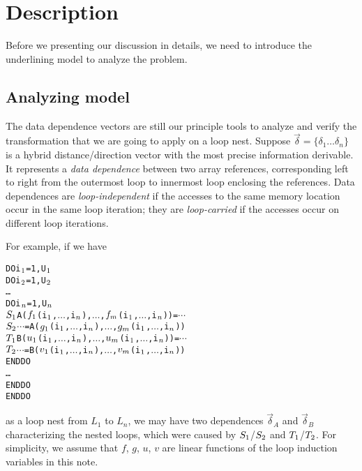 
\section{Description}
\label{description}

Before we presenting our discussion in details, we need to introduce
the underlining model to analyze the problem.

\subsection{Analyzing model}
\label{sec:model}

The data dependence vectors\cite{Ban88} are still our principle tools
to analyze and verify the transformation that we are going to apply on
a loop nest. Suppose $\vec{\delta} =\{\delta_{1}\dots\delta_{n}\}$
is a hybrid distance/direction vector with the most precise
information derivable. It represents a \emph{data dependence} between two
array references, corresponding left to right from the outermost loop
to innermost loop enclosing the references. Data dependences are
\emph{loop-independent} if the accesses to the same memory location
occur in the same loop iteration; they are \emph{loop-carried} if the
accesses occur on different loop iterations.

For example, if we have

{\small
\begin{alltt}
 DO i\(\sb{1}\) = 1, U\(\sb{1}\)
   DO i\(\sb{2}\) = 1, U\(\sb{2}\)
     \dots
     DO i\(\sb{n}\) = 1, U\(\sb{n}\)
\(S\sb{1}\)     A(\(f\sb{1}\)(i\(\sb{1}\),\(\dots\),i\(\sb{n}\)),\(\dots\),\(f\sb{m}\)(i\(\sb{1}\),\(\dots\),i\(\sb{n}\)))=\(\cdots\)
\(S\sb{2}\)     \(\cdots\)=A(\(g\sb{1}\)(i\(\sb{1}\),\(\dots\),i\(\sb{n}\)),\(\dots\),\(g\sb{m}\)(i\(\sb{1}\),\(\dots\),i\(\sb{n}\)))
\(T\sb{1}\)     B(\(u\sb{1}\)(i\(\sb{1}\),\(\dots\),i\(\sb{n}\)),\(\dots\),\(u\sb{m}\)(i\(\sb{1}\),\(\dots\),i\(\sb{n}\)))=\(\cdots\)
\(T\sb{2}\)     \(\cdots\)=B(\(v\sb{1}\)(i\(\sb{1}\),\(\dots\),i\(\sb{n}\)),\(\dots\),\(v\sb{m}\)(i\(\sb{1}\),\(\dots\),i\(\sb{n}\)))
     END DO
     \dots
   END DO
 END DO
\end{alltt}
}

as a loop nest from $L_{1}$ to $L_{n}$, we may have two dependences
$\vec{\delta}_{A}$ and $\vec{\delta}_{B}$ characterizing the nested
loops, which were caused by $S\sb{1}$/$S\sb{2}$ and
$T\sb{1}$/$T\sb{2}$. For simplicity, we assume that $f$, $g$, $u$, $v$
are linear functions of the loop induction variables in this note.

